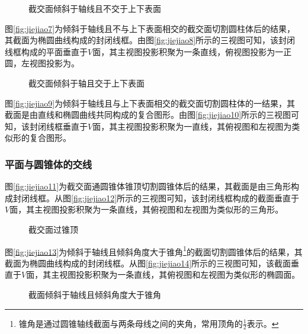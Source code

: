 \begin{figure}[htbp]
\centering
{}\hspace{60pt}
\caption{截交面倾斜于轴线且不交于上下表面}
\end{figure}
图\ref{fig:jiejiao7}为倾斜于轴线且不与上下表面相交的截交面切割圆柱体后的结果，其截面为椭圆曲线构成的封闭线框。由图\ref{fig:jiejiao8}所示的三视图可知，该封闭线框构成的平面垂直于$V$面，其主视图投影积聚为一条直线，俯视图投影为一正圆，左视图投影为。

\begin{figure}[htbp]
\hspace{60pt}
\caption{截交面倾斜于轴且交于上下表面}
\end{figure}
图\ref{fig:jiejiao9}为倾斜于轴线且与上下表面相交的截交面切割圆柱体的一结果，其截面是由直线和椭圆曲线共同构成的复合图形。由图\ref{fig:jiejiao10}所示的三视图可知，该封闭线框垂直于$V$面，其主视图投影积聚为一直线，其俯视图和左视图为类似形的复合图形。

\subsubsection{平面与圆锥体的交线}

图\ref{fig:jiejiao11}为截交面通圆锥体锥顶切割圆锥体后的结果，其截面是由三角形构成封闭线框。从图\ref{fig:jiejiao12}所示的三视图可知，该封闭线框构成的截面垂直于$V$面，其主视图投影积聚为一条直线，其俯视图和左视图为类似形的三角形。
 \begin{figure}[htbp]
 \centering
{}\hspace{60pt}
\caption{截交面过锥顶}
\end{figure}

图\ref{fig:jiejiao13}为倾斜于轴线且倾斜角度大于锥角\footnote{锥角是通过圆锥轴线截面与两条母线之间的夹角，常用顶角的$\frac{1}{2}$表示。}的截面切割圆锥体后的结果，其截面为椭圆曲线构成的封闭线框。从图\ref{fig:jiejiao14}所示的三视图可知，该截面垂直于$V$面，其主视图投影积聚为一条直线，其俯视图和左视图为类似形的椭圆面。
\begin{figure}[htbp]
\centering
{}\hspace{60pt}
\caption{截面倾斜于轴线且倾斜角度大于锥角}
\end{figure}

